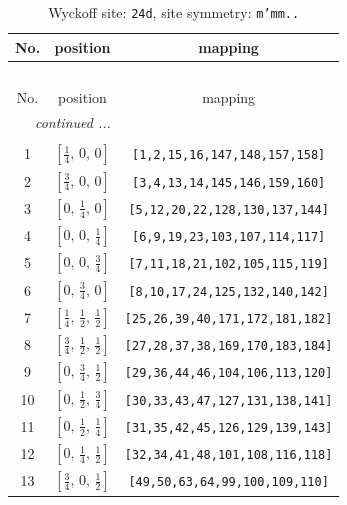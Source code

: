 \documentclass[fleqn,8pt]{jsarticle}
\begin{document}
\begin{longtable}{ccc}
\caption{Wyckoff site: {\tt 24d}, site symmetry: {\tt m'mm..}}
 \\
 \hline \hline
No. & position & mapping \\ \hline \endfirsthead

\multicolumn{2}{l}{\tablename\ \thetable{}} \\
 \hline \hline
No. & position & mapping \\ \hline \endhead

 \hline \hline
\multicolumn{2}{r}{\footnotesize\it continued ...} \\ \endfoot

 \hline \hline
\multicolumn{2}{r}{} \\ \endlastfoot

1 & $\left[ \frac{1}{4},\, 0,\, 0 \right]$ & {\tt [1,2,15,16,147,148,157,158]} \\ \hline
2 & $\left[ \frac{3}{4},\, 0,\, 0 \right]$ & {\tt [3,4,13,14,145,146,159,160]} \\ \hline
3 & $\left[ 0,\, \frac{1}{4},\, 0 \right]$ & {\tt [5,12,20,22,128,130,137,144]} \\ \hline
4 & $\left[ 0,\, 0,\, \frac{1}{4} \right]$ & {\tt [6,9,19,23,103,107,114,117]} \\ \hline
5 & $\left[ 0,\, 0,\, \frac{3}{4} \right]$ & {\tt [7,11,18,21,102,105,115,119]} \\ \hline
6 & $\left[ 0,\, \frac{3}{4},\, 0 \right]$ & {\tt [8,10,17,24,125,132,140,142]} \\ \hline
7 & $\left[ \frac{1}{4},\, \frac{1}{2},\, \frac{1}{2} \right]$ & {\tt [25,26,39,40,171,172,181,182]} \\ \hline
8 & $\left[ \frac{3}{4},\, \frac{1}{2},\, \frac{1}{2} \right]$ & {\tt [27,28,37,38,169,170,183,184]} \\ \hline
9 & $\left[ 0,\, \frac{3}{4},\, \frac{1}{2} \right]$ & {\tt [29,36,44,46,104,106,113,120]} \\ \hline
10 & $\left[ 0,\, \frac{1}{2},\, \frac{3}{4} \right]$ & {\tt [30,33,43,47,127,131,138,141]} \\ \hline
11 & $\left[ 0,\, \frac{1}{2},\, \frac{1}{4} \right]$ & {\tt [31,35,42,45,126,129,139,143]} \\ \hline
12 & $\left[ 0,\, \frac{1}{4},\, \frac{1}{2} \right]$ & {\tt [32,34,41,48,101,108,116,118]} \\ \hline
13 & $\left[ \frac{3}{4},\, 0,\, \frac{1}{2} \right]$ & {\tt [49,50,63,64,99,100,109,110]} \\ \hline

\end{longtable}
\end{document}
